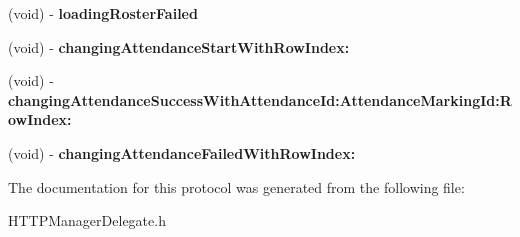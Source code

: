 \begin{DoxyCompactItemize}
\item 
\hypertarget{protocol_h_t_t_p_manager_delegate-p_a8cdbefac0e7ed477ab9b5a6e520869e7}{(void) -\/ {\bfseries loading\+Roster\+Failed}}\label{protocol_h_t_t_p_manager_delegate-p_a8cdbefac0e7ed477ab9b5a6e520869e7}

\item 
\hypertarget{protocol_h_t_t_p_manager_delegate-p_a4527736a908629a83e8d7d94a072a0c6}{(void) -\/ {\bfseries changing\+Attendance\+Start\+With\+Row\+Index\+:}}\label{protocol_h_t_t_p_manager_delegate-p_a4527736a908629a83e8d7d94a072a0c6}

\item 
\hypertarget{protocol_h_t_t_p_manager_delegate-p_ac7ed46d7973315bd0d6dbf46f4cd47f1}{(void) -\/ {\bfseries changing\+Attendance\+Success\+With\+Attendance\+Id\+:\+Attendance\+Marking\+Id\+:\+Row\+Index\+:}}\label{protocol_h_t_t_p_manager_delegate-p_ac7ed46d7973315bd0d6dbf46f4cd47f1}

\item 
\hypertarget{protocol_h_t_t_p_manager_delegate-p_a96a3021d728a65c8a95b404df164dbbd}{(void) -\/ {\bfseries changing\+Attendance\+Failed\+With\+Row\+Index\+:}}\label{protocol_h_t_t_p_manager_delegate-p_a96a3021d728a65c8a95b404df164dbbd}

\end{DoxyCompactItemize}


The documentation for this protocol was generated from the following file\+:\begin{DoxyCompactItemize}
\item 
H\+T\+T\+P\+Manager\+Delegate.\+h\end{DoxyCompactItemize}
